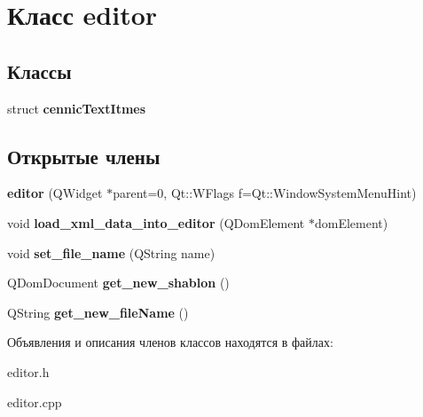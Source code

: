 \hypertarget{classeditor}{\section{Класс editor}
\label{classeditor}
}
\subsection*{Классы}
\begin{DoxyCompactItemize}
\item 
struct {\bfseries cennic\-Text\-Itmes}
\end{DoxyCompactItemize}
\subsection*{Открытые члены}
\begin{DoxyCompactItemize}
\item 
\hypertarget{classeditor_a1a6d65252613816a70dc1a18ed9a3c60}{{\bfseries editor} (\-Q\-Widget $\ast$parent=0, \-Qt\-::\-W\-Flags f=\-Qt\-::\-Window\-System\-Menu\-Hint)}\label{classeditor_a1a6d65252613816a70dc1a18ed9a3c60}

\item 
\hypertarget{classeditor_aebfa77945700e8331f5b40a595a620f2}{void {\bfseries load\-\_\-xml\-\_\-data\-\_\-into\-\_\-editor} (\-Q\-Dom\-Element $\ast$dom\-Element)}\label{classeditor_aebfa77945700e8331f5b40a595a620f2}

\item 
\hypertarget{classeditor_a6c67a9289ba67348464a9ca9e9e19887}{void {\bfseries set\-\_\-file\-\_\-name} (\-Q\-String name)}\label{classeditor_a6c67a9289ba67348464a9ca9e9e19887}

\item 
\hypertarget{classeditor_a4a81e279f5ddd2ff1ec201c19de06d60}{\-Q\-Dom\-Document {\bfseries get\-\_\-new\-\_\-shablon} ()}\label{classeditor_a4a81e279f5ddd2ff1ec201c19de06d60}

\item 
\hypertarget{classeditor_a76582bfc5e00deed3a9f3337d5941513}{\-Q\-String {\bfseries get\-\_\-new\-\_\-file\-Name} ()}\label{classeditor_a76582bfc5e00deed3a9f3337d5941513}

\end{DoxyCompactItemize}


Объявления и описания членов классов находятся в файлах\-:\begin{DoxyCompactItemize}
\item 
editor.\-h\item 
editor.\-cpp\end{DoxyCompactItemize}
